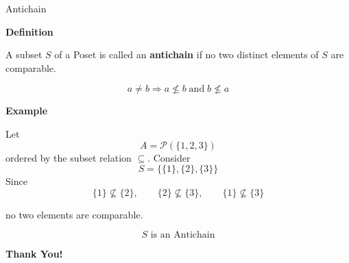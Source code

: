 \documentclass[aspectratio=169]{beamer}
\begin{document}
\begin{frame}{Antichain}

\textbf{Definition}

A subset \(S\) of a Poset is called an \textbf{antichain} if no
two distinct elements of \(S\) are comparable.

\[
a\ne b\Rightarrow
a\nleq b\;\text{and}\;b\nleq a
\]

\vspace{0.2cm}

\textbf{Example}

Let
\[
A=\mathcal{P}(\{1,2,3\})
\]
ordered by the subset relation \(\subseteq\).
Consider
\[
S=\{\{1\},\{2\},\{3\}\}
\]
Since
\[
\{1\}\nsubseteq\{2\},\qquad
\{2\}\nsubseteq\{3\},\qquad
\{1\}\nsubseteq\{3\}
\]

no two elements are comparable.

\[
\boxed{S\text{ is an Antichain}}
\]

\end{frame}

\begin{frame}{}

\textbf{Thank You!}\centering

\end{frame}

\end{document}
